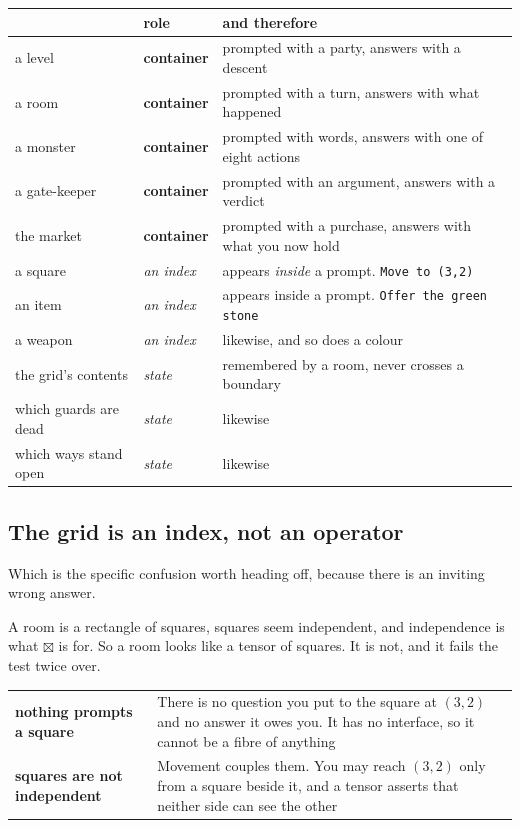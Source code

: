 \documentclass[11pt,a4paper]{article}
\begin{document}
\begin{center}
\begin{tabular}{@{}l@{\hspace{4mm}}l@{\hspace{4mm}}>{\raggedright\arraybackslash}p{}@{}}
\toprule
& \textbf{role} & \textbf{and therefore} \\
\midrule
a level    & \textbf{container} & prompted with a party, answers with a descent \\
a room     & \textbf{container} & prompted with a turn, answers with what happened \\
a monster  & \textbf{container} & prompted with words, answers with one of eight actions \\
a gate-keeper   & \textbf{container} & prompted with an argument, answers with a verdict \\
the market & \textbf{container} & prompted with a purchase, answers with what you now hold \\
\midrule
a square   & \emph{an index}    & appears \emph{inside} a prompt. \texttt{Move to (3,2)} \\
an item    & \emph{an index}    & appears inside a prompt. \texttt{Offer the green stone} \\
a weapon   & \emph{an index}    & likewise, and so does a colour \\
\midrule
the grid's contents & \emph{state} & remembered by a room, never crosses a boundary \\
which guards are dead & \emph{state} & likewise \\
which ways stand open & \emph{state} & likewise \\
\bottomrule
\end{tabular}
\end{center}

\subsection{The grid is an index, not an operator}

Which is the specific confusion worth heading off, because there is an inviting wrong answer.

A room is a rectangle of squares, squares seem independent, and independence is what
$\boxtimes$ is for. So a room looks like a tensor of squares. It is not, and it fails the test twice
over.

\begin{center}
\begin{tabular}{@{}l@{\hspace{5mm}}>{\raggedright\arraybackslash}p{}@{}}
\toprule
\textbf{nothing prompts a square} & There is no question you put to the square at $(3,2)$ and no
answer it owes you. It has no interface, so it cannot be a fibre of anything \\[1mm]
\textbf{squares are not independent} & Movement couples them. You may reach $(3,2)$ only from a
square beside it, and a tensor asserts that neither side can see the other \\
\bottomrule
\end{tabular}
\end{center}
\end{document}
